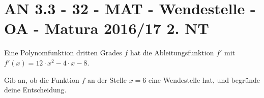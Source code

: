 \section{AN 3.3 - 32 - MAT - Wendestelle - OA - Matura 2016/17 2. NT}

\begin{beispiel}{1} %
Eine Polynomfunktion dritten Grades $f$ hat die Ableitungsfunktion $f'$ mit $f'(x)=12\cdot x^2 - 4 \cdot x - 8$.

Gib an, ob die Funktion $f$ an der Stelle $x=6$ eine Wendestelle hat, und begründe deine Entscheidung.


\end{beispiel}